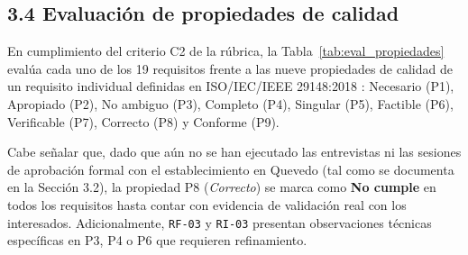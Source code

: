 \documentclass[onecolumn,12pt]{IEEEtran}
\begin{document}
	
	\subsection{3.4 Evaluaci\'on de propiedades de calidad}
	
	En cumplimiento del criterio C2 de la r\'ubrica, la Tabla~\ref{tab:eval_propiedades} eval\'ua cada uno de los 19 requisitos frente a las nueve propiedades de calidad de un requisito individual definidas en ISO/IEC/IEEE 29148:2018 \cite{iso29148}: Necesario (P1), Apropiado (P2), No ambiguo (P3), Completo (P4), Singular (P5), Factible (P6), Verificable (P7), Correcto (P8) y Conforme (P9).
	
	Cabe se\~nalar que, dado que a\'un no se han ejecutado las entrevistas ni las sesiones de aprobaci\'on formal con el establecimiento en Quevedo (tal como se documenta en la Secci\'on 3.2), la propiedad P8 (\textit{Correcto}) se marca como \textbf{No cumple} en todos los requisitos hasta contar con evidencia de validaci\'on real con los interesados. Adicionalmente, \texttt{RF-03} y \texttt{RI-03} presentan observaciones t\'ecnicas espec\'ificas en P3, P4 o P6 que requieren refinamiento.
	
\end{document}
